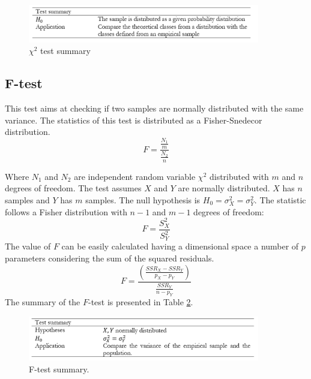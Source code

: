 \begin{figure}[hbt!]
\centering
\includegraphics[width=0.9\textwidth]{SectionLetsMath/elemStat_figures/tab_Chi2.png}
\captionsetup{type=table}
\caption{$\chi^2$ test summary}
\label{tab_Chi2}
\end{figure}

\subsection{F-test}
This test aims at checking if two samples are normally distributed with the same variance. The statistics of this test is distributed as a Fisher-Snedecor distribution.
\begin{equation}
F=\frac{\frac{N_1}{m}}{\frac{N_2}{n}}
\label{eq_FisherDistribution}
\end{equation}

Where $N_1$ and $N_2$ are independent random variable $\chi^2$ distributed with $m$ and $n$ degrees of freedom. The test assumes $X$ and $Y$ are normally distributed. $X$ has $n$ samples and $Y$ has $m$ samples. The null hypothesis is $H_0=\sigma_X^2=\sigma_Y^2$. The statistic follows a Fisher distribution with $n-1$ and $m-1$ degrees of freedom:
\begin{equation}
F=\frac{S_X^2}{S_Y^2}
\label{eq_FisherTest1}
\end{equation}
The value of $F$ can be easily calculated having a dimensional space a number of $p$ parameters considering the sum of the squared residuals.
\begin{equation}
F=\frac{\left(\frac{SSR_X-SSR_Y}{p_X-p_Y}\right)}{\frac{SSR_Y}{n-p_Y}}
\label{eq_FisherTest2}
\end{equation}
The summary of the $F$-test is presented in Table \ref{tab_Ftest}.

\begin{figure}[hbt!]
\centering
\includegraphics[width=0.9\textwidth]{SectionLetsMath/elemStat_figures/tab_Ftest.png}
\captionsetup{type=table}
\caption{F-test summary.}
\label{tab_Ftest}
\end{figure}

